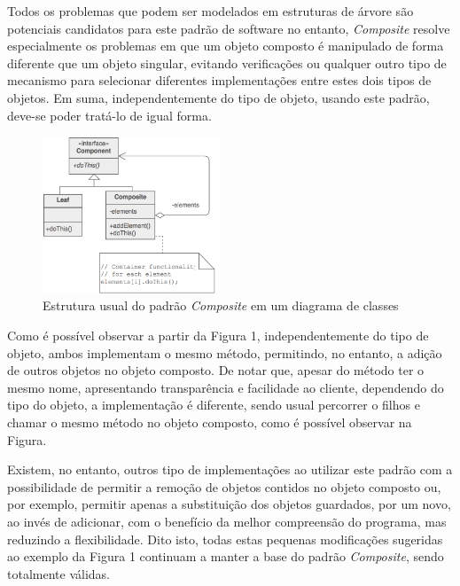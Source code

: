 \documentclass[10pt,portuguese]{article}
\begin{document}
\par Todos os problemas que podem ser modelados em estruturas de árvore são potenciais candidatos para este padrão de software no entanto, \textit{Composite} resolve especialmente os problemas em que um objeto composto é manipulado de forma diferente que um objeto singular, evitando verificações ou qualquer outro tipo de mecanismo para selecionar diferentes implementações entre estes dois tipos de objetos. Em suma, independentemente do tipo de objeto, usando este padrão, deve-se poder tratá-lo de igual forma.

\begin{figure}[!h]
    \centering
    \includegraphics[width=200]{images/composite/UML.png}
    \caption{Estrutura usual do padrão \textit{Composite} em um diagrama de classes}
\end{figure}

\par Como é possível observar a partir da Figura 1, independentemente do tipo de objeto, ambos implementam o mesmo método, permitindo, no entanto,  a adição de outros objetos no objeto composto. De notar que, apesar do método ter o mesmo nome, apresentando transparência e facilidade ao cliente, dependendo do tipo do objeto, a implementação é diferente, sendo usual percorrer o filhos e chamar o mesmo método no objeto composto, como é possível observar na Figura.

\par Existem, no entanto, outros tipo de implementações ao utilizar este padrão com a possibilidade de permitir a remoção de objetos contidos no objeto composto ou, por exemplo, permitir apenas a substituição dos objetos guardados, por um novo, ao invés de adicionar, com o benefício da melhor compreensão do programa, mas reduzindo a flexibilidade. Dito isto, todas estas pequenas modificações sugeridas ao exemplo da Figura 1 continuam a manter a base do padrão \textit{Composite}, sendo totalmente válidas.
\end{document}

